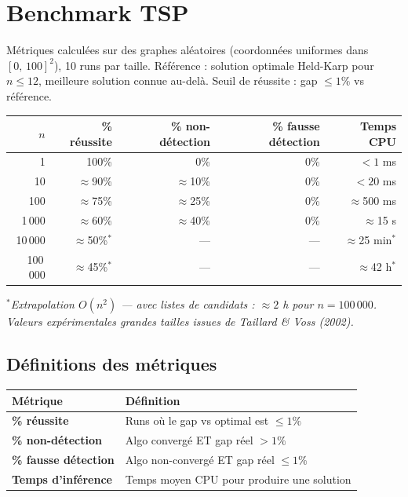 \documentclass[11pt,a4paper]{article}
\begin{document}
\section{Benchmark TSP}

Métriques calculées sur des graphes aléatoires (coordonnées uniformes dans
$[0,\,100]^2$), 10 runs par taille. Référence : solution optimale Held-Karp
pour $n \leq 12$, meilleure solution connue au-delà. Seuil de réussite :
gap $\leq 1\%$ vs référence.

\begin{center}
\begin{tabular}{r r r r r}
  \toprule
  $n$ & \% réussite & \% non-détection & \% fausse détection & Temps CPU \\
  \midrule
  1           & 100\% & 0\%  & 0\% & $< 1$ ms      \\
  10          & $\approx$90\% & $\approx$10\% & 0\% & $< 20$ ms \\
  100         & $\approx$75\% & $\approx$25\% & 0\% & $\approx$500 ms \\
  1\,000      & $\approx$60\% & $\approx$40\% & 0\% & $\approx$15 s \\
  10\,000     & $\approx$50\%$^*$ & ---  & --- & $\approx$25 min$^*$ \\
  100\,000    & $\approx$45\%$^*$ & ---  & --- & $\approx$42 h$^*$ \\
  \bottomrule
\end{tabular}
\end{center}

\textit{$^*$Extrapolation $O(n^2)$ --- avec listes de candidats : $\approx 2$ h
pour $n = 100\,000$. Valeurs expérimentales grandes tailles issues de Taillard
\& Voss (2002).}

\subsection*{Définitions des métriques}

\begin{center}
\begin{tabularx}{\textwidth}{lX}
  \toprule
  Métrique & Définition \\
  \midrule
  \textbf{\% réussite}         & Runs où le gap vs optimal est $\leq 1\%$ \\
  \textbf{\% non-détection}    & Algo convergé ET gap réel $> 1\%$ \\
  \textbf{\% fausse détection} & Algo non-convergé ET gap réel $\leq 1\%$ \\
  \textbf{Temps d'inférence}   & Temps moyen CPU pour produire une solution \\
  \bottomrule
\end{tabularx}
\end{center}
\end{document}

